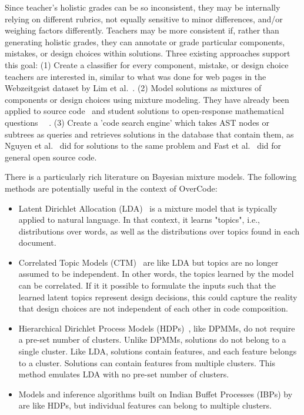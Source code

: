 Since teacher's holistic grades can be so inconsistent, they may be internally relying on different rubrics, not equally sensitive to minor differences, and/or weighing factors differently. Teachers may be more consistent if, rather than generating holistic grades, they can annotate or grade particular components, mistakes, or design choices within solutions. Three existing approaches support this goal: (1) Create a classifier for every component, mistake, or design choice teachers are interested in, similar to what was done for web pages in the Webzeitgeist dataset by Lim et al.~\cite{lim2012learning}. (2) Model solutions as mixtures of components or design choices using mixture modeling. They have already been applied to source code~\cite{} and student solutions to open-response mathematical questions~\cite{} ~\cite{binkley2014understanding,Linstead}. (3) Create a 'code search engine' which takes AST nodes or subtrees as queries and retrieves solutions in the database that contain them, as Nguyen et al.~\cite{codewebs} did for solutions to the same problem and Fast et al.~\cite{codex} did for general open source code.

There is a particularly rich literature on Bayesian mixture models. The following methods are potentially useful in the context of OverCode: 
\begin{itemize}
\item Latent Dirichlet Allocation (LDA)~\cite{bleiLDA} is a mixture model that is typically applied to natural language. In that context, it learns "topics", i.e., distributions over words, as well as the distributions over topics found in each document. %
\item Correlated Topic Models (CTM)~\cite{} are like LDA but topics are no longer assumed to be independent. In other words, the topics learned by the model can be correlated. If it it possible to formulate the inputs such that the learned latent topics represent design decisions, this could capture the reality that design choices are not independent of each other in code composition.
\item Hierarchical Dirichlet Process Models (HDPs)~\cite{}, like DPMMs, do not require a pre-set number of clusters. Unlike DPMMs, solutions do not belong to a single cluster. Like LDA, solutions contain features, and each feature belongs to a cluster. Solutions can contain features from multiple clusters. This method emulates LDA with no pre-set number of clusters. 
\item Models and inference algorithms built on Indian Buffet Processes (IBPs) by \citet{doshi2009indian} are like HDPs, but individual features can belong to multiple clusters.
\end{itemize}

